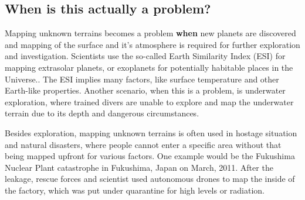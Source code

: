 \subsection{When is this actually a problem?}
Mapping unknown terrains becomes a problem \textbf{when} new planets are discovered and mapping of the surface and it's atmosphere is required for further exploration and investigation. Scientists use the so-called Earth Similarity Index (ESI) for mapping extrasolar planets, or exoplanets for potentially habitable places in the Universe.\cite{exoplanets}\cite{esi}. The ESI implies many factors, like surface temperature and other Earth-like properties. Another scenario, when this is a problem, is underwater exploration, where trained divers are unable to explore and map the underwater terrain due to its depth and dangerous circumstances.

Besides exploration, mapping unknown terrains is often used in hostage situation and natural disasters, where people cannot enter a specific area without that being mapped upfront for various factors. One example would be the Fukushima Nuclear Plant catastrophe in Fukushima, Japan on March, 2011. After the leakage, rescue forces and scientist used autonomous drones to map the inside of the factory, which was put under quarantine for high levels or radiation.



